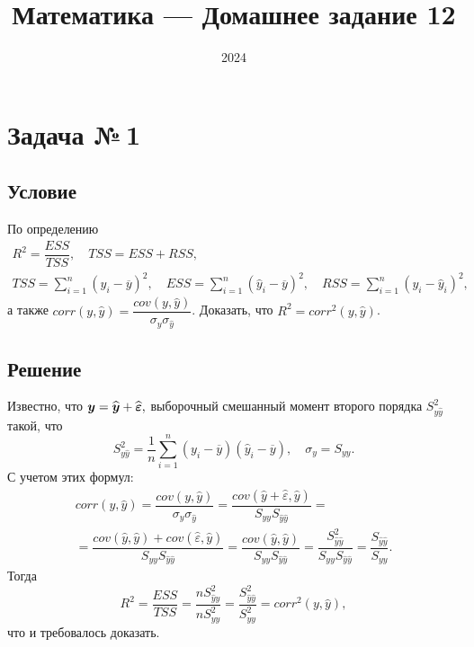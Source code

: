 \documentclass[12pt, a4paper]{article}
\title{Математика --- Домашнее задание 12}
\date{2024}
\renewcommand{\vec}[1]{\text{\mathversion{bold}${#1}$}}%
\newcommand{\eps}{\varepsilon}
\begin{document}
	
	\maketitle
	\tableofcontents
	\pagebreak
	
	
	\section{Задача №\,1}
	
		\subsection*{Условие}	
		
		
			По определению 
			\begin{gather*}
				R^2 = \dfrac{ESS}{TSS}, \quad TSS = ESS + RSS, \\
				TSS = \displaystyle\sum_{i=1}^{n}(y_i - \overline{y})^2, \quad
				ESS = \displaystyle\sum_{i=1}^{n}(\widehat{y}_i - \overline{y})^2, \quad
				RSS = \displaystyle\sum_{i=1}^{n}(y_i - \widehat{y}_i)^2,
			\end{gather*}
			а также $corr(y, \widehat{y}) = \dfrac{cov(y, \widehat{y})}{\sigma_{y} \sigma_{\widehat{y}}}$. 
			Доказать, что $R^2 = corr^2 (y, \widehat{y})$.
		
		\subsection*{Решение}
		
			Известно, что 
			$
			\vec{y} = \widehat{\vec{y}} + \widehat{\vec{\eps}},
			$
			выборочный смешанный момент второго порядка $S^2_{y\widehat{y}}$ такой, что
			$$
				S^2_{y\widehat{y}} = \dfrac{1}{n} \sum_{i=1}^{n} (y_i - \overline{y})(\widehat{y}_i - \overline{y}), 
				\quad
				\sigma_y = S_{yy}.
			$$
			С учетом этих формул:
			\begin{multline*}
				corr(y, \widehat{y}) = 
				\dfrac{cov(y, \widehat{y})}{\sigma_{y} \sigma_{\widehat{y}}} = 
				\dfrac{cov(\widehat{y} + \widehat{\eps} , \widehat{y})}{S_{yy} S_{\widehat{y}\widehat{y}}}
				= \\ =
				\dfrac{
					cov(\widehat{y}, \widehat{y}) + cov(\widehat{\eps}, \widehat{y})
				}{
					S_{yy}S_{\widehat{y}\widehat{y}}
				} =
				\dfrac{
					cov(\widehat{y}, \widehat{y})
				}{
					S_{yy}S_{\widehat{y}\widehat{y}}
				} = 
				\dfrac{
					S^2_{\widehat{y}\widehat{y}}
				}{
					S_{yy} S_{\widehat{y}\widehat{y}}
				} = 
				\dfrac{
					S_{\widehat{y}\widehat{y}}
				}{
					S_{yy}
				}.
			\end{multline*}
			Тогда 
			$$
				R^2 = \dfrac{ESS}{TSS} = \dfrac{n S^2_{\widehat{y}\widehat{y}}}{n S^2_{yy}} =  \dfrac{S^2_{\widehat{y}\widehat{y}}}{S^2_{yy}} = corr^2(y, \widehat{y}),
			$$
			что и требовалось доказать.
		
\end{document}
